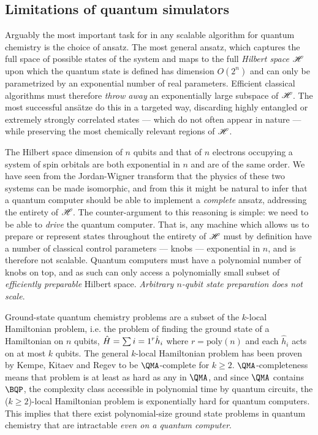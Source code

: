 
\subsection{Limitations of quantum simulators}
Arguably the most important task for in any scalable algorithm for quantum chemistry is the choice of ansatz. The most general ansatz, which captures the full space of possible states of the system and maps to the full \emph{Hilbert space} $\mathscr{H}$ upon which the quantum state is defined has dimension $O(2^n)$ and can only be parametrized by an exponential number of real parameters.  Efficient classical algorithms must therefore \emph{throw away} an exponentially large subspace of $\mathscr{H}$. The most successful ans\"atze do this in a targeted way, discarding highly entangled or extremely strongly correlated states --- which do not often appear in nature --- while preserving the most chemically relevant regions of $\mathscr{H}$.  

The Hilbert space dimension of $n$ qubits and that of $n$ electrons occupying a system of spin orbitals are both exponential in $n$ and are of the same order.  We have seen from the Jordan-Wigner transform that the physics of these two systems can be made isomorphic, and from this it might be natural to infer that a quantum computer should be able to implement a \emph{complete} ansatz, addressing the entirety of $\mathscr{H}$. The counter-argument to this reasoning is simple: we need to be able to \emph{drive} the quantum computer. That is, any machine which allows us to prepare or represent states  throughout the entirety of $\mathscr{H}$ must by definition have a number of classical control parameters --- knobs --- exponential in $n$, and is therefore not scalable. Quantum computers must have a polynomial number of knobs on top, and as such can only access a polynomially small subset of \emph{efficiently preparable} Hilbert space. \emph{Arbitrary $n$-qubit state preparation does not scale}. 

Ground-state quantum chemistry problems are a subset of the $k$-local Hamiltonian problem, i.e. the problem of finding the ground state of a Hamiltonian on $n$ qubits, $\hat{H} = \sum{i=1}^{r} \hat{h}_i$ where $r=\mathrm{poly}(n)$ and each $\hat{h}_i$ acts on at most $k$ qubits. The general $k$-local Hamiltonian problem has been proven \cite{Kempe2004} by Kempe, Kitaev and Regev to be $\QMA$-complete for $k\ge 2$. $\QMA$-completeness means that problem is at least as hard as any in $\QMA$, and since $\QMA$ contains $\BQP$, the complexity class accessible in polynomial time by quantum circuits, the ($k\ge 2$)-local Hamiltonian problem is exponentially hard for quantum computers. This implies that there exist polynomial-size ground state problems in quantum chemistry that are intractable \emph{even on a quantum computer}.


